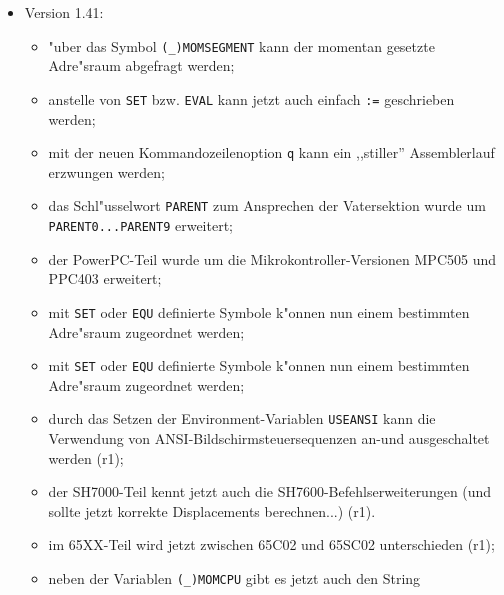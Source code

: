 \documentclass[12pt,a4paper,twoside]{report}
\newcommand{\tty}[1]{{\tt #1}}
\newcommand{\predefsym}[1]{{\tt (\_)#1}}
\begin{document}
\begin{itemize}
{\begin{itemize}
      \item{der \verb!~~!-Operator ist in der Rangfolge auf einen
            sinnvolleren Platz gerutscht (r9);}
      \item{\tty{ASSUME} ber"ucksichtigt f"ur den 6809 jetzt auch das
            DPR-Register und seine Auswirkungen (pardon, r9);}
      \item{Der 6809-Teil kennt nun auch die versteckten
            Erweiterungen des 6309 (r9);}
      \item{Bin"arkonstanten k"onnen jetzt auch in C-artiger
            Notation geschrieben werden (r9).}
      \end{itemize}}
\item{Version 1.41:
      \begin{itemize}
      \item{"uber das Symbol \predefsym{MOMSEGMENT} kann der momentan
            gesetzte Adre"sraum abgefragt werden;}
      \item{anstelle von \tty{SET} bzw. \tty{EVAL} kann jetzt auch
            einfach \tty{:=} geschrieben werden;}
      \item{mit der neuen Kommandozeilenoption \tty{q} kann ein ,,stiller''
            Assemblerlauf erzwungen werden;}
      \item{das Schl"usselwort \tty{PARENT} zum Ansprechen der
            Vatersektion wurde um \tty{PARENT0...PARENT9} erweitert;}
      \item{der PowerPC-Teil wurde um die Mikrokontroller-Versionen
            MPC505 und PPC403 erweitert;}
      \item{mit \tty{SET} oder \tty{EQU} definierte Symbole k"onnen
            nun einem bestimmten Adre"sraum zugeordnet werden;}
      \item{mit \tty{SET} oder \tty{EQU} definierte Symbole k"onnen
            nun einem bestimmten Adre"sraum zugeordnet werden;}
      \item{durch das Setzen der Environment-Variablen \tty{USEANSI}
            kann die Verwendung von ANSI-Bildschirmsteuersequenzen
            an-und ausgeschaltet werden (r1);}
      \item{der SH7000-Teil kennt jetzt auch die SH7600-Befehlserweiterungen
            (und sollte jetzt korrekte Displacements berechnen...) (r1).}
      \item{im 65XX-Teil wird jetzt zwischen 65C02 und 65SC02 unterschieden
            (r1);}
      \item{neben der Variablen \predefsym{MOMCPU} gibt es jetzt auch den String
}
\end{itemize}}
\end{itemize}
\end{document}
